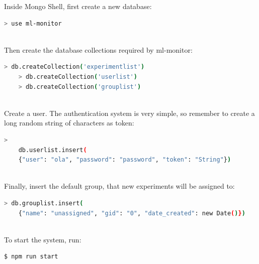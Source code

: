 \noindent Inside Mongo Shell, first create a new database:
\begin{lstlisting}[language=bash]
    > use ml-monitor
\end{lstlisting}
~\\

\noindent Then create the database collections required by ml-monitor:
\begin{lstlisting}[language=bash]
    > db.createCollection('experimentlist')
    > db.createCollection('userlist')
    > db.createCollection('grouplist')
\end{lstlisting}
~\\

\noindent Create a user. The authentication system is very simple, so remember to create a long random string of characters as token:
\begin{lstlisting}[language=bash]> 
    db.userlist.insert(
    {"user": "ola", "password": "password", "token": "String"})
\end{lstlisting}
~\\

\noindent Finally, insert the default group, that new experiments will be assigned to:
\begin{lstlisting}[language=bash]
    > db.grouplist.insert(
    {"name": "unassigned", "gid": "0", "date_created": new Date()})
\end{lstlisting}
~\\

\noindent To start the system, run:
\begin{lstlisting}[language=bash]
    $ npm run start
\end{lstlisting}

